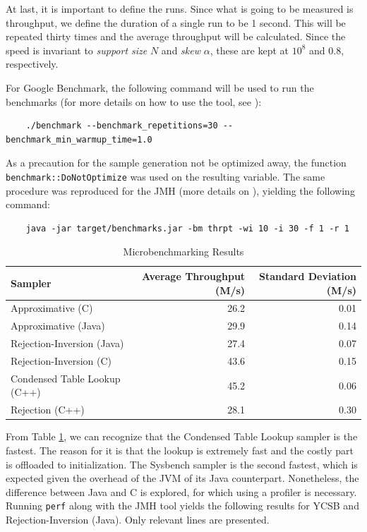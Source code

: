 At last, it is important to define the runs. Since what is going to be measured is throughput, we define the duration of a single run to be 1 second. This will be repeated thirty times
and the average throughput will be calculated. Since the speed is invariant to \textit{support size} $N$ and \textit{skew} $\alpha$, these are kept at $10^8$ and $0.8$, respectively.

For Google Benchmark, the following command will be used to run the benchmarks (for more details on how to use the tool, see \cite{GoogleBenchmarkMicrobenchmark}):
\begin{lstlisting}
    ./benchmark --benchmark_repetitions=30 --benchmark_min_warmup_time=1.0
\end{lstlisting}

As a precaution for the sample generation not be optimized away, the function \verb|benchmark::DoNotOptimize| was used on the resulting variable. The
same procedure was reproduced for the JMH (more details on \cite{AvoidingBenchmarkingPitfalls,jenkovJMHJavaMicrobenchmark}), yielding the following command:
\begin{lstlisting}
    java -jar target/benchmarks.jar -bm thrpt -wi 10 -i 30 -f 1 -r 1
\end{lstlisting}

\begin{table}[hbt]
    \centering
    \begin{tabular}{|l|r|r|}
        \hline
        \textbf{Sampler} & \textbf{Average Throughput (M/s)} & \textbf{Standard Deviation (M/s)} \\
        \hline
        Approximative (C) & 26.2 & 0.01 \\
        \hline
        Approximative (Java) & 29.9 & 0.14 \\
        \hline
        Rejection-Inversion (Java) & 27.4 & 0.07 \\
        \hline
        Rejection-Inversion (C) & 43.6 & 0.15 \\
        \hline
        Condensed Table Lookup (C++) & 45.2 & 0.06 \\
        \hline
        Rejection (C++) & 28.1 & 0.30 \\
        \hline
    \end{tabular}
    \caption{Microbenchmarking Results}\label{tab:microbenchmarking-results}
\end{table}

From Table \ref{tab:microbenchmarking-results}, we can recognize that the Condensed Table Lookup sampler is the fastest. The reason for it is that the lookup is extremely fast
and the costly part is offloaded to initialization. The Sysbench sampler is the second fastest, which is expected given the overhead of the JVM of its Java counterpart.
Nonetheless, the difference between Java and C is explored, for which using a profiler is necessary. Running \verb|perf| \cite{PerfLinuxProfilinga} 
along with the JMH tool yields the following results for YCSB and Rejection-Inversion (Java). Only relevant lines are presented.

